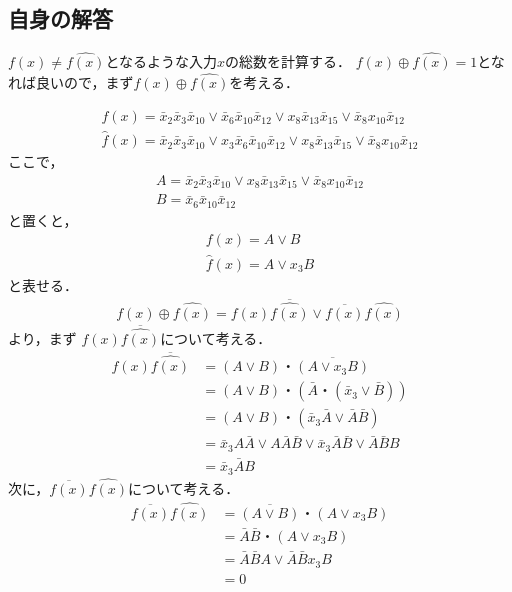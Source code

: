 \documentclass[dvipdfmx,a4paper,12pt]{jsarticle}
\begin{document}
 \subsection*{自身の解答}
 $f(x) \neq \hat{f(x)}$となるような入力$x$の総数を計算する．
 $f(x) \oplus \hat{f(x)}=1$となれば良いので，まず$f(x) \oplus \hat{f(x)}$を考える．
  
 \begin{gather*}
f(x) = \bar{x}_{2}\bar{x}_{3}\bar{x}_{10}\lor\bar{x}_{6}\bar{x}_{10}\bar{x}_{12}\lor x_{8}\bar{x}_{13}\bar{x}_{15}\lor \bar{x}_{8}x_{10}\bar{x}_{12} \\
\hat{f}(x) = \bar{x}_{2}\bar{x}_{3}\bar{x}_{10} \lor x_{3}\bar{x}_{6}\bar{x}_{10}\bar{x}_{12} \lor x_{8}\bar{x}_{13}\bar{x}_{15} \lor \bar{x}_{8}x_{10}\bar{x}_{12}
\end{gather*}  
ここで，
 \begin{gather*}
A = \bar{x}_{2}\bar{x}_{3}\bar{x}_{10}\lor x_{8}\bar{x}_{13}\bar{x}_{15}\lor \bar{x}_{8}x_{10}\bar{x}_{12} \\
B  = \bar{x}_{6}\bar{x}_{10}\bar{x}_{12} 
\end{gather*}  
と置くと，
\begin{gather*}
f(x) = A \lor B \\
\hat{f}(x) = A \lor x_{3}B 
\end{gather*}  
と表せる．
\begin{gather*}
f(x) \oplus \hat{f(x)} = f(x)\overline{\hat{f(x)}} \lor \overline{f(x)}\hat{f(x)} 
\end{gather*}  
より，まず $f(x)\overline{\hat{f(x)}}$について考える．
\begin{align*}
f(x)\overline{\hat{f(x)}}  & = (A \lor B)・\overline{(A \lor x_{3}B)} \\
& = (A \lor B)・(\bar{A} ・(\bar{x}_{3} \lor \bar{B})) \\
& = (A \lor B)・(\bar{x}_{3}\bar{A} \lor \bar{A}\bar{B}) \\
& = \bar{x}_{3}A\bar{A} \lor A\bar{A}\bar{B} \lor \bar{x}_{3}\bar{A}\bar{B} \lor \bar{A}\bar{B}B \\
& = \bar{x}_{3}\bar{A}B \tag{i}
\end{align*}  
次に，$\overline{f(x)}\hat{f(x)}$について考える．
\begin{align*}
\overline{f(x)}\hat{f(x)}  & = \overline{(A \lor B)}・(A \lor x_{3}B) \\
& = \bar{A}\bar{B}・(A \lor x_{3}B) \\
& = \bar{A}\bar{B}A \lor  \bar{A}\bar{B}x_{3}B \\
& = 0 \tag{ii}
\end{align*}  
\end{document}

